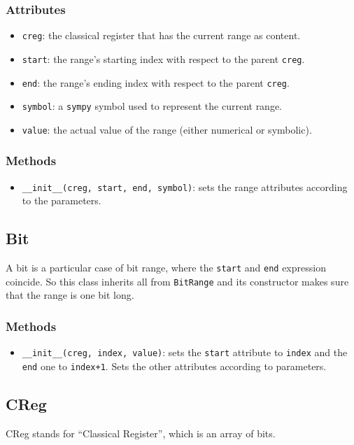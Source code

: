 \documentclass[12pt,a4paper]{report}
\theoremstyle{definition}
\theoremstyle{definition}
\theoremstyle{definition}
\begin{document}
\subsubsection{Attributes}
\begin{itemize}
    \itemsep 0em
    \item \texttt{creg}: the classical register that has the current range as content.
    \item \texttt{start}: the range's starting index with respect to the parent \texttt{creg}.
    \item \texttt{end}: the range's ending index with respect to the parent \texttt{creg}.
    \item \texttt{symbol}: a \texttt{sympy} symbol used to represent the current range.
    \item \texttt{value}: the actual value of the range (either numerical or symbolic).
\end{itemize}
\subsubsection{Methods}
\begin{itemize}
    \itemsep 0em
    \item \texttt{\_\_init\_\_(creg, start, end, symbol)}: sets the range attributes according to the parameters.
\end{itemize}

\subsection{Bit}
A bit is a particular case of bit range, where the \texttt{start} and \texttt{end} expression coincide. So this class inherits all from \texttt{BitRange} and its constructor makes sure that the range is one bit long.
\subsubsection{Methods}
\begin{itemize}
    \itemsep 0em
    \item \texttt{\_\_init\_\_(creg, index, value)}: sets the \texttt{start} attribute to \texttt{index} and the \texttt{end} one to \texttt{index+1}. Sets the other attributes according to parameters.
\end{itemize}




\subsection{CReg}
CReg stands for ``Classical Register'', which is an array of bits.
\end{document}
